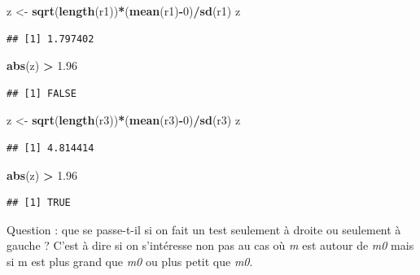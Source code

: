 \documentclass[
]{book}
\newenvironment{Shaded}{\begin{snugshade}}{\end{snugshade}}
\newcommand{\DecValTok}[1]{\textcolor[rgb]{0.00,0.00,0.81}{#1}}
\newcommand{\FloatTok}[1]{\textcolor[rgb]{0.00,0.00,0.81}{#1}}
\newcommand{\FunctionTok}[1]{\textcolor[rgb]{0.13,0.29,0.53}{\textbf{#1}}}
\newcommand{\NormalTok}[1]{#1}
\newcommand{\OtherTok}[1]{\textcolor[rgb]{0.56,0.35,0.01}{#1}}
\newcommand{\SpecialCharTok}[1]{\textcolor[rgb]{0.81,0.36,0.00}{\textbf{#1}}}
\begin{document}
\begin{Shaded}
\begin{Highlighting}[]
\NormalTok{z }\OtherTok{\textless{}{-}} \FunctionTok{sqrt}\NormalTok{(}\FunctionTok{length}\NormalTok{(r1))}\SpecialCharTok{*}\NormalTok{(}\FunctionTok{mean}\NormalTok{(r1)}\SpecialCharTok{{-}}\DecValTok{0}\NormalTok{)}\SpecialCharTok{/}\FunctionTok{sd}\NormalTok{(r1)}
\NormalTok{z}
\end{Highlighting}
\end{Shaded}

\begin{verbatim}
## [1] 1.797402
\end{verbatim}

\begin{Shaded}
\begin{Highlighting}[]
\FunctionTok{abs}\NormalTok{(z) }\SpecialCharTok{\textgreater{}} \FloatTok{1.96}
\end{Highlighting}
\end{Shaded}

\begin{verbatim}
## [1] FALSE
\end{verbatim}

\begin{Shaded}
\begin{Highlighting}[]
\NormalTok{z }\OtherTok{\textless{}{-}} \FunctionTok{sqrt}\NormalTok{(}\FunctionTok{length}\NormalTok{(r3))}\SpecialCharTok{*}\NormalTok{(}\FunctionTok{mean}\NormalTok{(r3)}\SpecialCharTok{{-}}\DecValTok{0}\NormalTok{)}\SpecialCharTok{/}\FunctionTok{sd}\NormalTok{(r3)}
\NormalTok{z}
\end{Highlighting}
\end{Shaded}

\begin{verbatim}
## [1] 4.814414
\end{verbatim}

\begin{Shaded}
\begin{Highlighting}[]
\FunctionTok{abs}\NormalTok{(z) }\SpecialCharTok{\textgreater{}} \FloatTok{1.96}
\end{Highlighting}
\end{Shaded}

\begin{verbatim}
## [1] TRUE
\end{verbatim}

Question : que se passe-t-il si on fait un test seulement à droite ou seulement
à gauche ? C'est à dire si on s'intéresse non pas au cas où \emph{m} est autour de
\emph{m0} mais si m est plus grand que \emph{m0} ou plus petit que \emph{m0}.
\end{document}
